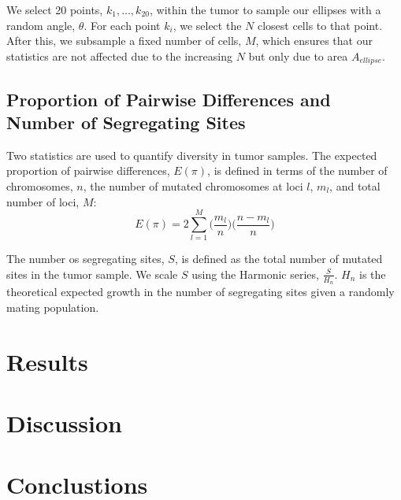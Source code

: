 \documentclass[12pt]{article}
\begin{document}
We select 20 points, $k_1,\ldots,k_{20}$, within the tumor to sample our ellipses with a random angle, $\theta$. For each point $k_i$, we select the $N$ closest cells to that point. After this, we subsample a fixed number of cells, $M$, which ensures that our statistics are not affected due to the increasing $N$ but only due to area $A_{ellipse}$.

\subsection{Proportion of Pairwise Differences and Number of Segregating Sites}
Two statistics are used to quantify diversity in tumor samples. The expected proportion of pairwise differences, $E(\pi)$, is defined in terms of the number of chromosomes, $n$, the number of mutated chromosomes at loci $l$, $m_l$, and total number of loci, $M$:
\begin{equation} \label{eq:Epi}
	E(\pi) = 2\sum_{l=1}^M \Big(\frac{m_l}{n}\Big) \Big( \frac{n-m_l}{n}\Big) 
\end{equation}

The number os segregating sites, $S$, is defined as the total number of mutated sites in the tumor sample. We scale $S$ using the Harmonic series, $\frac{S}{H_n}$. $H_n$ is the theoretical expected growth in the number of segregating sites given a randomly mating population.


% 
% 
\section{Results}




% 
% 
\section{Discussion}




% 
% 
\section{Conclustions}


\newpage


\end{document}
